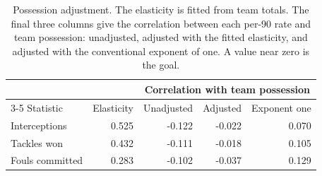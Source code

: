 \begin{table}[t]
\centering
\small
\caption{Possession adjustment. The elasticity is fitted from team totals. The final three columns give the correlation between each per-90 rate and team possession: unadjusted, adjusted with the fitted elasticity, and adjusted with the conventional exponent of one. A value near zero is the goal.}
\label{tab:padj}
\begin{tabular}{lrrrr}
\toprule
 & & \multicolumn{3}{c}{Correlation with team possession} \\
\cmidrule(lr){3-5}
Statistic & Elasticity & Unadjusted & Adjusted & Exponent one \\
\midrule
Interceptions & 0.525 & -0.122 & -0.022 & 0.070 \\
Tackles won & 0.432 & -0.111 & -0.018 & 0.105 \\
Fouls committed & 0.283 & -0.102 & -0.037 & 0.129 \\
\bottomrule
\end{tabular}
\end{table}

